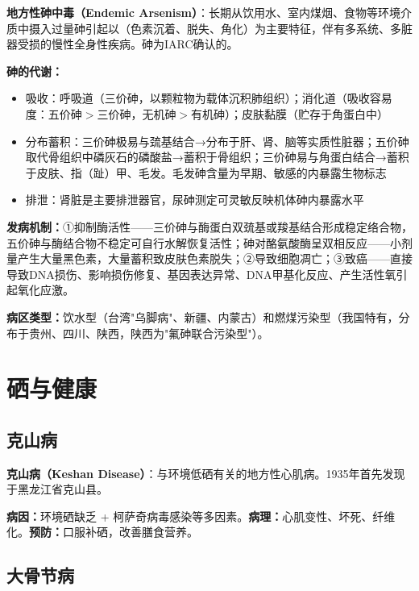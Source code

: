 \documentclass[10pt,a4paper,oneside]{ctexbook}
\begin{document}
\begin{defbox}
\textbf{地方性砷中毒（Endemic Arsenism）}：长期从饮用水、室内煤烟、食物等环境介质中摄入过量砷引起以（色素沉着、脱失、角化）为主要特征，伴有多系统、多脏器受损的慢性全身性疾病。砷为IARC确认的。

\textbf{砷的代谢：}
\begin{itemize}[leftmargin=*]
    \item 吸收：呼吸道（三价砷，以颗粒物为载体沉积肺组织）；消化道（吸收容易度：五价砷$>$三价砷，无机砷$>$有机砷）；皮肤黏膜（贮存于角蛋白中）
    \item 分布蓄积：三价砷极易与巯基结合→分布于肝、肾、脑等实质性脏器；五价砷取代骨组织中磷灰石的磷酸盐→蓄积于骨组织；三价砷易与角蛋白结合→蓄积于皮肤、指（趾）甲、毛发。毛发砷含量为早期、敏感的内暴露生物标志
    \item 排泄：肾脏是主要排泄器官，尿砷测定可灵敏反映机体砷内暴露水平
\end{itemize}

\textbf{发病机制：}①抑制酶活性——三价砷与酶蛋白双巯基或羧基结合形成稳定络合物，五价砷与酶结合物不稳定可自行水解恢复活性；砷对酪氨酸酶呈双相反应——小剂量产生大量黑色素，大量蓄积致皮肤色素脱失；②导致细胞凋亡；③致癌——直接导致DNA损伤、影响损伤修复、基因表达异常、DNA甲基化反应、产生活性氧引起氧化应激。

\textbf{病区类型：}饮水型（台湾"乌脚病"、新疆、内蒙古）和燃煤污染型（我国特有，分布于贵州、四川、陕西，陕西为"氟砷联合污染型"）。
\end{defbox}

\section{硒与健康}

\subsection{克山病}

\begin{defbox}
\textbf{克山病（Keshan Disease）}：与环境低硒有关的地方性心肌病。1935年首先发现于黑龙江省克山县。
\end{defbox}

\textbf{病因：}环境硒缺乏 + 柯萨奇病毒感染等多因素。\textbf{病理：}心肌变性、坏死、纤维化。\textbf{预防：}口服补硒，改善膳食营养。

\subsection{大骨节病}
\end{document}
